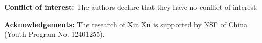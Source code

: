 \documentclass[12pt,reqno]{amsart}
\numberwithin{equation}{section}
\begin{document}

\noindent\textbf{Conflict of interest:} The authors declare that they have no conflict of interest.


\noindent\textbf{Acknowledgements:}
 The research of Xin Xu is supported by NSF of
China (Youth Program No. 12401255).


\end{document}
